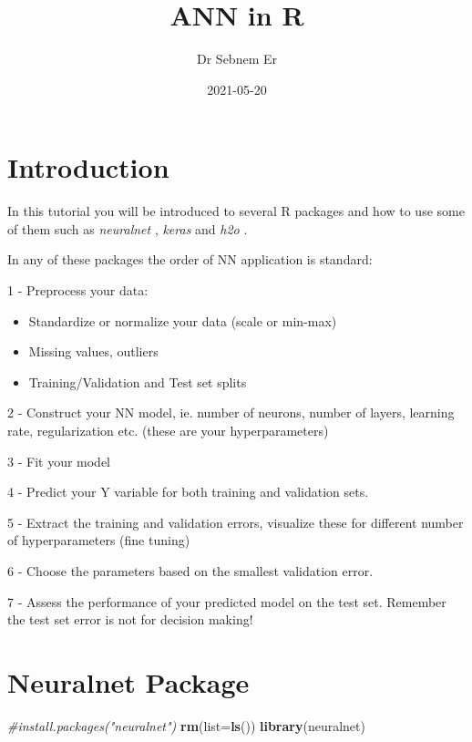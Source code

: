 \documentclass[
]{book}
\title{ANN in R}
\author{Dr Sebnem Er}
\date{2021-05-20}
\newenvironment{Shaded}{\begin{snugshade}}{\end{snugshade}}
\newcommand{\CommentTok}[1]{\textcolor[rgb]{0.56,0.35,0.01}{\textit{#1}}}
\newcommand{\DataTypeTok}[1]{\textcolor[rgb]{0.13,0.29,0.53}{#1}}
\newcommand{\KeywordTok}[1]{\textcolor[rgb]{0.13,0.29,0.53}{\textbf{#1}}}
\newcommand{\NormalTok}[1]{#1}
\begin{document}
\maketitle

{
\setcounter{tocdepth}{1}
\tableofcontents
}
\hypertarget{introduction}{%
\chapter{Introduction}\label{introduction}}

In this tutorial you will be introduced to several R packages and how to use some of them such as \emph{neuralnet} , \emph{keras} and \emph{h2o} .

In any of these packages the order of NN application is standard:

1 - Preprocess your data:

\begin{itemize}
\item
  Standardize or normalize your data (scale or min-max)
\item
  Missing values, outliers
\item
  Training/Validation and Test set splits
\end{itemize}

2 - Construct your NN model, ie. number of neurons, number of layers, learning rate, regularization etc. (these are your hyperparameters)

3 - Fit your model

4 - Predict your Y variable for both training and validation sets.

5 - Extract the training and validation errors, visualize these for different number of hyperparameters (fine tuning)

6 - Choose the parameters based on the smallest validation error.

7 - Assess the performance of your predicted model on the test set. Remember the test set error is not for decision making!

\hypertarget{neuralnet}{%
\chapter{Neuralnet Package}\label{neuralnet}}

\begin{Shaded}
\begin{Highlighting}[]
\CommentTok{#install.packages("neuralnet")}
\KeywordTok{rm}\NormalTok{(}\DataTypeTok{list=}\KeywordTok{ls}\NormalTok{())}
\KeywordTok{library}\NormalTok{(neuralnet)}
\end{Highlighting}
\end{Shaded}
\end{document}
